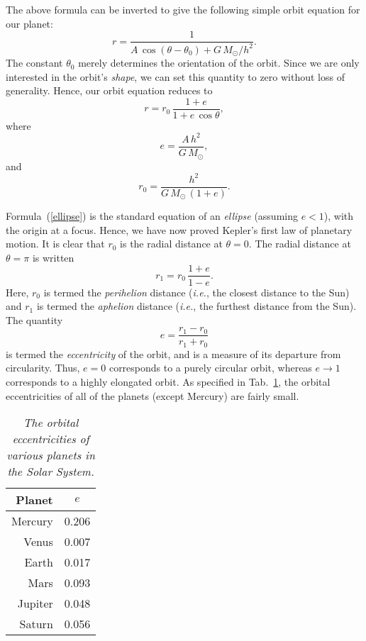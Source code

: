 The above formula can be inverted to give the following simple orbit equation for our planet:
\begin{equation}
r = \frac{1}{A\,\cos(\theta-\theta_0) + G\,M_\odot/h^2}.
\end{equation}
The constant $\theta_0$ merely determines the orientation of the orbit. Since we are
only interested in the orbit's {\em shape}, we can set this quantity to zero without
loss of generality. Hence, our orbit equation reduces to
\begin{equation}\label{ellipse}
r = r_0\,\frac{1+e}{1+ e\,\cos\theta},
\end{equation}
where
\begin{equation}
e = \frac{A\,h^2}{G\,M_\odot},
\end{equation}
and
\begin{equation}\label{r0}
r_0 = \frac{h^2}{G\,M_\odot\,(1+e)}.
\end{equation}

Formula~(\ref{ellipse}) is the standard equation of an {\em ellipse} (assuming  $e<1$), with the
origin at a focus. Hence, we have now proved Kepler's first law of planetary motion.
It is clear that $r_0$ is the radial distance at $\theta=0$. The radial distance at
$\theta=\pi$ is written
\begin{equation}\label{r1}
r_1 = r_0\,\frac{1+e}{1-e}.
\end{equation}
Here, $r_0$ is termed the {\em perihelion} distance ({\em i.e.}, the closest distance to the
Sun) and $r_1$ is termed the {\em aphelion} distance  ({\em i.e.}, the furthest distance from  the
Sun). The quantity
\begin{equation}
e = \frac{r_1-r_0}{r_1+r_0}
\end{equation}
is termed the {\em eccentricity} of the orbit, and is a measure of its departure from
circularity. Thus, $e=0$ corresponds to a purely circular orbit, whereas $e\rightarrow 1$
corresponds to a highly elongated orbit. As specified in Tab.~\ref{tecc}, the orbital
eccentricities of all of the planets (except Mercury) are fairly small.

\begin{table}
\centering
\begin{tabular}{r|c}
Planet & $e$ \\[0.5ex] \hline
Mercury & 0.206  \\[0.5ex]
Venus & 0.007\\[0.5ex]
Earth & 0.017\\ [0.5ex]
Mars & 0.093 \\[0.5ex]
Jupiter & 0.048 \\ [0.5ex]
Saturn & 0.056 \\
\end{tabular}
\caption{\em The orbital eccentricities of various planets in the Solar System.}\label{tecc}
\end{table}

